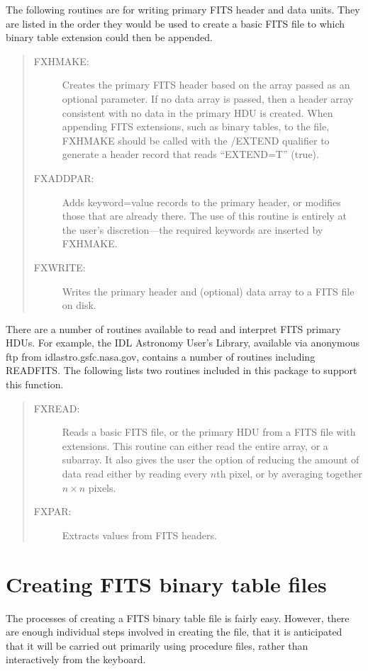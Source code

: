 The following routines are for writing primary FITS header and data units.
They are listed in the order they would be used to create a basic FITS file to
which binary table extension could then be appended.
\begin{quote}
\begin{description}
\item[FXHMAKE:]
Creates the primary FITS header based on the array passed as an optional
parameter.  If no data array is passed, then a header array consistent with no
data in the primary HDU is created.  When appending FITS extensions, such as
binary tables, to the file, FXHMAKE should be called with the /EXTEND qualifier
to generate a header record that reads ``EXTEND=T'' (true).
\item[FXADDPAR:]
Adds keyword=value records to the primary header, or modifies those that are
already there.  The use of this routine is entirely at the user's
discretion---the required keywords are inserted by FXHMAKE.
\item[FXWRITE:]
Writes the primary header and (optional) data array to a FITS file on disk.
\end{description}
\end{quote}

There are a number of routines available to read and interpret FITS primary
HDUs.  For example, the IDL Astronomy User's Library, available via anonymous
ftp from idlastro.gsfc.nasa.gov, contains a number of routines including
READFITS\@.  The following lists two routines included in this package to
support this function.
\begin{quote}
\begin{description}
\item[FXREAD:]
Reads a basic FITS file, or the primary HDU from a FITS file with extensions.
This routine can either read the entire array, or a subarray.  It also gives
the user the option of reducing the amount of data read either by reading every
$n$th pixel, or by averaging together \mbox{$n \times n$} pixels.
\item[FXPAR:]
Extracts values from FITS headers.
\end{description}
\end{quote}

\section{Creating FITS binary table files}
\label{creating}

The processes of creating a FITS binary table file is fairly easy.  However,
there are enough individual steps involved in creating the file, that it is
anticipated that it will be carried out primarily using procedure files, rather
than interactively from the keyboard.

